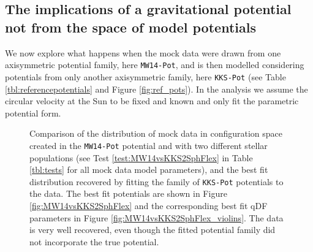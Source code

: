 \subsection{The implications of a gravitational potential not from the space of model potentials} \label{sec:results_potential}


We now explore what happens when the mock data were drawn from one axisymmetric potential family, here \texttt{MW14-Pot}, and is then modelled considering potentials from only another axisymmetric family, here \texttt{KKS-Pot} (see Table \ref{tbl:referencepotentials} and Figure \ref{fig:ref_pots}). In the analysis we assume the circular velocity at the Sun to be fixed and known and only fit the parametric potential form. 


\begin{figure}[!htbp]
\caption{Comparison of the distribution of mock data in configuration space created in the \texttt{MW14-Pot} potential and with two different stellar populations (see Test \ref{test:MW14vsKKS2SphFlex} in Table \ref{tbl:tests} for all mock data model parameters), and the best fit distribution recovered by fitting the family of \texttt{KKS-Pot} potentials to the data. The best fit potentials are shown in Figure \ref{fig:MW14vsKKS2SphFlex} and the corresponding best fit qDF parameters in Figure \ref{fig:MW14vsKKS2SphFlex_violins}. The data is very well recovered, even though the fitted potential family did not incorporate the true potential. }
\label{fig:MW14vsKKS2SphFlex_mockdata_residuals}
\end{figure}

